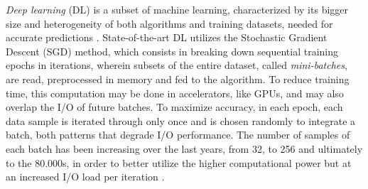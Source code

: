 \documentclass[conference]{IEEEtran}
\begin{document}
    \textit{Deep learning} (DL) is a subset of machine learning, characterized by its bigger size and heterogeneity of both algorithms and training datasets, needed for accurate predictions \cite{gradient}. State-of-the-art DL utilizes the Stochastic Gradient Descent (SGD) method, which consists in breaking down sequential training epochs in iterations, wherein subsets of the entire dataset, called \textit{mini-batches}, are read, preprocessed in memory and fed to the algorithm. To reduce training time, this computation may be done in accelerators, like GPUs, and may also overlap the I/O of future batches. To maximize accuracy, in each epoch, each data sample is iterated through only once and is chosen randomly to integrate a batch, both patterns that degrade I/O performance. The number of samples of each batch has been increasing over the last years, from 32, to 256 and ultimately to the 80.000s, in order to better utilize the higher computational power but at an increased I/O load per iteration \cite{nvme}.
    
\end{document}
